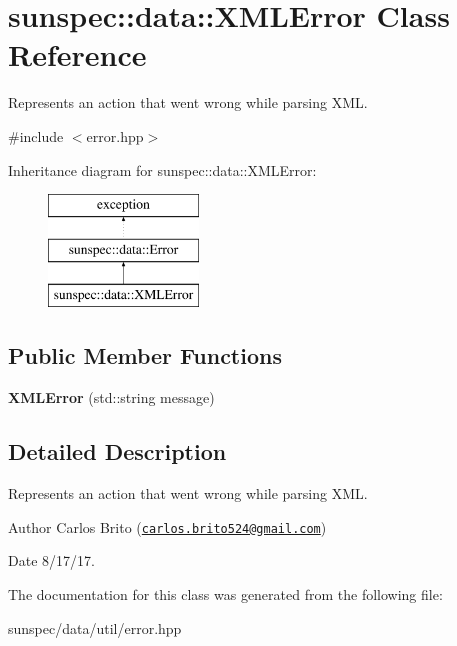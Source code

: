 \hypertarget{classsunspec_1_1data_1_1_x_m_l_error}{}\section{sunspec\+:\+:data\+:\+:X\+M\+L\+Error Class Reference}
\label{classsunspec_1_1data_1_1_x_m_l_error}


Represents an action that went wrong while parsing X\+ML.  




{\ttfamily \#include $<$error.\+hpp$>$}

Inheritance diagram for sunspec\+:\+:data\+:\+:X\+M\+L\+Error\+:\begin{figure}[H]
\begin{center}
\leavevmode
\includegraphics[height=3.000000cm]{classsunspec_1_1data_1_1_x_m_l_error}
\end{center}
\end{figure}
\subsection*{Public Member Functions}
\begin{DoxyCompactItemize}
\item 
\mbox{\label{classsunspec_1_1data_1_1_x_m_l_error_a42d5a8db9d1ecbbc10671e1666d6bf72}} 
{\bfseries X\+M\+L\+Error} (std\+::string message)
\end{DoxyCompactItemize}


\subsection{Detailed Description}
Represents an action that went wrong while parsing X\+ML. 

\begin{DoxyAuthor}{Author}
Carlos Brito (\href{mailto:carlos.brito524@gmail.com}{\tt carlos.\+brito524@gmail.\+com}) 
\end{DoxyAuthor}
\begin{DoxyDate}{Date}
8/17/17. 
\end{DoxyDate}


The documentation for this class was generated from the following file\+:\begin{DoxyCompactItemize}
\item 
sunspec/data/util/error.\+hpp\end{DoxyCompactItemize}
